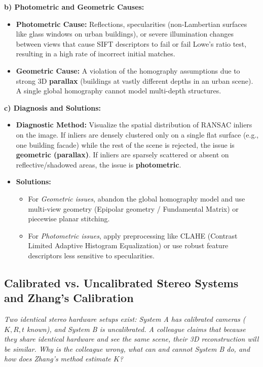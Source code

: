 \textbf{b) Photometric and Geometric Causes:}
\begin{itemize}
    \item \textbf{Photometric Cause:} Reflections, specularities (non-Lambertian surfaces like glass windows on urban buildings), or severe illumination changes between views that cause SIFT descriptors to fail or fail Lowe's ratio test, resulting in a high rate of incorrect initial matches.
    \item \textbf{Geometric Cause:} A violation of the homography assumptions due to strong 3D \textbf{parallax} (buildings at vastly different depths in an urban scene). A single global homography cannot model multi-depth structures.
\end{itemize}

\textbf{c) Diagnosis and Solutions:}
\begin{itemize}
    \item \textbf{Diagnostic Method:} Visualize the spatial distribution of RANSAC inliers on the image. If inliers are densely clustered only on a single flat surface (e.g., one building facade) while the rest of the scene is rejected, the issue is \textbf{geometric (parallax)}. If inliers are sparsely scattered or absent on reflective/shadowed areas, the issue is \textbf{photometric}.
    \item \textbf{Solutions:}
    \begin{itemize}
        \item For \textit{Geometric issues}, abandon the global homography model and use multi-view geometry (Epipolar geometry / Fundamental Matrix) or piecewise planar stitching.
        \item For \textit{Photometric issues}, apply preprocessing like CLAHE (Contrast Limited Adaptive Histogram Equalization) or use robust feature descriptors less sensitive to specularities.
    \end{itemize}
\end{itemize}

\subsection[Question -- {\it Calibrated vs. Uncalibrated Stereo Systems and Zhang's Calibration}]{}

\subsection{Calibrated vs. Uncalibrated Stereo Systems and Zhang's Calibration}
\textit{Two identical stereo hardware setups exist: System A has calibrated cameras ($K, R, t$ known), and System B is uncalibrated. A colleague claims that because they share identical hardware and see the same scene, their 3D reconstruction will be similar. Why is the colleague wrong, what can and cannot System B do, and how does Zhang's method estimate $K$?}

